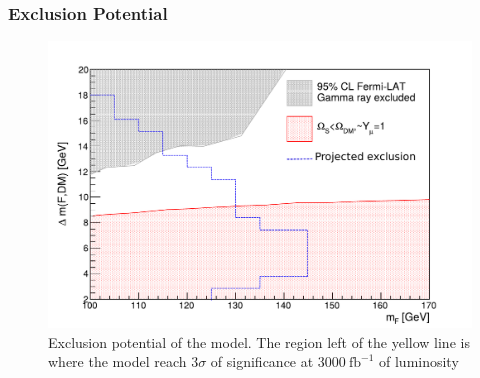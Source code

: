 \documentclass{beamer}
\begin{document}
\begin{frame}

\frametitle{Exclusion Potential}

\begin{figure}
\centering

\includegraphics[scale=0.45]{pictures/LimitPlotsTesis_WithData} 
\caption{Exclusion potential of the model. The region left of the yellow line is where the model reach $3\sigma$ of significance at $3000~\text{fb}^{-1}$ of luminosity}
\label{results2}
\end{figure}

\end{frame}

\end{document}

